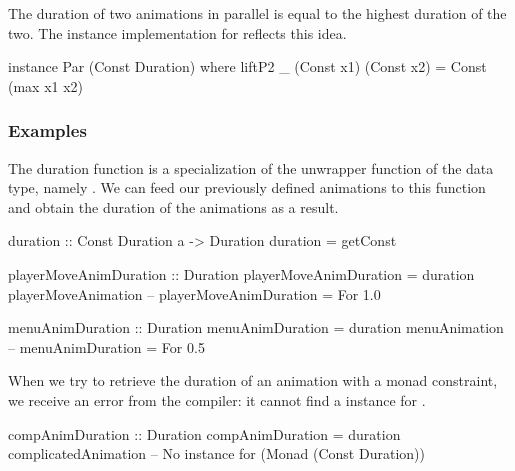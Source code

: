 The duration of two animations in parallel is equal to the highest duration of the two. The  instance implementation for  reflects this idea. 

\begin{code}
instance Par (Const Duration) where
  liftP2 _ (Const x1) (Const x2) = Const (max x1 x2)
\end{code}

\subsubsection{Examples}

The duration function is a specialization of the unwrapper function of the  data type, namely . We can feed our previously defined animations to this function and obtain the duration of the animations as a result.

\begin{code}
duration :: Const Duration a -> Duration
duration = getConst

playerMoveAnimDuration :: Duration
playerMoveAnimDuration = duration playerMoveAnimation
-- playerMoveAnimDuration = For 1.0

menuAnimDuration :: Duration
menuAnimDuration = duration menuAnimation
-- menuAnimDuration = For 0.5
\end{code}

When we try to retrieve the duration of an animation with a monad constraint, we receive an error from the compiler: it cannot find a  instance for .

\begin{spec}
compAnimDuration :: Duration
compAnimDuration = duration complicatedAnimation
-- No instance for (Monad (Const Duration))
\end{spec}
